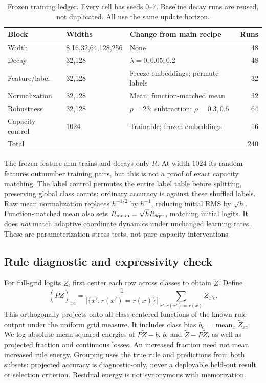 \documentclass{article}
\begin{document}
\begin{table}[t]
\centering\small
\caption{Frozen training ledger. Every cell has seeds 0--7. Baseline decay runs are reused, not duplicated. All use the same update horizon.}\label{tab:ledger}
\begin{tabular}{lll r}\toprule
Block & Widths & Change from main recipe & Runs\\\midrule
Width & 8,16,32,64,128,256 & None &48\\
Decay &32,128&$\lambda=0,0.05,0.2$&48\\
Feature/label &32,128&Freeze embeddings; permute labels&32\\
Normalization &32,128&Mean; function-matched mean&32\\
Robustness &32,128&$p=23$; subtraction; $\rho=0.3,0.5$&64\\
Capacity control &1024&Trainable; frozen embeddings&16\\\midrule
Total&&&240\\\bottomrule
\end{tabular}
\end{table}

The frozen-feature arm trains and decays only $R$. At width 1024 its random features outnumber training pairs, but this is not a proof of exact capacity matching. The label control permutes the entire label table before splitting, preserving global class counts; ordinary accuracy is against these shuffled labels. Raw mean normalization replaces $h^{-1/2}$ by $h^{-1}$, reducing initial RMS by $\sqrt h$. Function-matched mean also sets $R_{\rm mean}=\sqrt h R_{\rm sqrt}$, matching initial logits. It does \emph{not} match adaptive coordinate dynamics under unchanged learning rates. These are parameterization stress tests, not pure capacity interventions.

\subsection{Rule diagnostic and expressivity check}
For full-grid logits $Z$, first center each row across classes to obtain $\widetilde Z$. Define
\begin{equation}
 (P\widetilde Z)_{xc}=\frac{1}{|\{x':r(x')=r(x)\}|}\sum_{x':r(x')=r(x)}\widetilde Z_{x'c}. \label{eq:proj}
\end{equation}
This orthogonally projects onto all class-centered functions of the known rule output under the uniform grid measure. It includes class bias $b_c=\operatorname{mean}_x\widetilde Z_{xc}$. We log absolute mean-squared energies of $P\widetilde Z-b$, $b$, and $\widetilde Z-P\widetilde Z$, as well as projected fraction and continuous losses. An increased fraction need not mean increased rule energy. Grouping uses the true rule and predictions from both subsets: projected accuracy is diagnostic-only, never a deployable held-out result or selection criterion. Residual energy is not synonymous with memorization.
\end{document}

